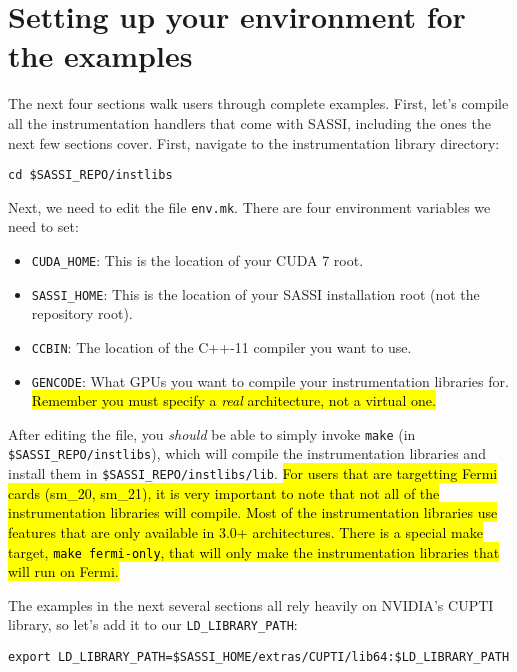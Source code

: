 \section{Setting up your environment for the examples}
\label{sec:environment}

The next four sections walk users through complete examples.  First,
let's compile all the instrumentation handlers that come with SASSI,
including the ones the next few sections cover.  First, navigate to
the instrumentation library directory:
\begin{lstlisting}[style=BashInputStyle]
cd $SASSI_REPO/instlibs
\end{lstlisting}
Next, we need to edit the file \texttt{env.mk}.  There are four
environment variables we need to set:
\begin{itemize}
\item \texttt{CUDA\_HOME}: This is the location of your CUDA 7 root.
\item \texttt{SASSI\_HOME}: This is the location of your SASSI
  installation root (not the repository root).
\item \texttt{CCBIN}: The location of the C++-11 compiler you want to
  use. 
\item \texttt{GENCODE}: What GPUs you want to compile your
  instrumentation libraries for. \hl{Remember you must specify a
    \emph{real} architecture, not a virtual one.}
\end{itemize}

After editing the file, you \emph{should} be able to simply invoke
\texttt{make} (in \texttt{\$SASSI\_REPO/instlibs}), which will compile
the instrumentation libraries and install them in
\texttt{\$SASSI\_REPO/instlibs/lib}. \hl{For users that are targetting
  Fermi cards (sm\_20, sm\_21), it is very important to note that not
  all of the instrumentation libraries will compile.  Most of the
  instrumentation libraries use features that are only available in
  3.0+ architectures.  There is a special make target, \texttt{make
    fermi-only}, that will only make the instrumentation libraries
  that will run on Fermi.}

The examples in the next several sections all rely heavily on NVIDIA's
CUPTI library, so let's add it to our \texttt{LD\_LIBRARY\_PATH}:
\begin{lstlisting}[style=BashInputStyle]
export LD_LIBRARY_PATH=$SASSI_HOME/extras/CUPTI/lib64:$LD_LIBRARY_PATH
\end{lstlisting}
